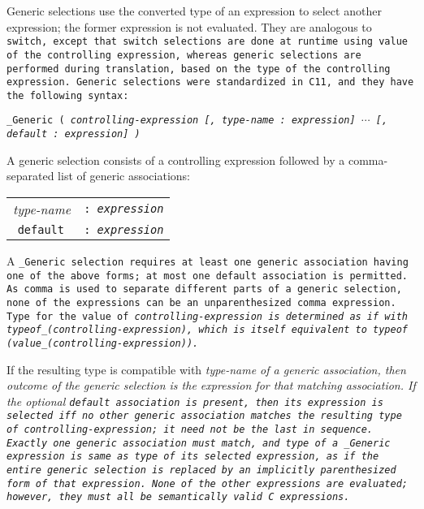 \def\Subsection#1{\subsection{#1}}

Generic selections use the converted type of an expression to
select another expression; the former expression is not evaluated.
They are analogous to \tt{switch}, except that \tt{switch} selections are done at
runtime using value of the controlling expression, whereas generic selections are
performed during translation, based on the type of the controlling expression.
Generic selections were standardized in C11, and they have the following syntax:

\tt{_Generic (} \it{controlling-expression}
[\tt{,} \it{type-name} \tt{:} \it{expression}] $\cdots$
[\tt{, default :} \it{expression}]
\tt{)}

A generic selection consists of a controlling expression
followed by a comma-separated list of generic associations:

\begin{tabular}{r@{\hskip 0pt}l}

\it{type-name} & \s\tt{:} \it{expression}\\

\tt{default} & \s\tt{:} \it{expression}\\

\end{tabular}

A \tt{_Generic} selection requires at least one generic association having
one of the above forms; at most one \tt{default} association is permitted.
As comma is used to separate different parts of a generic selection,
none of the expressions can be an unparenthesized comma expression.
Type for the value of \it{controlling-expression} is determined as if with
\tt{typeof_(}\it{controlling-expression}\tt{)}, which is itself equivalent to
\tt{typeof (value_(}\it{controlling-expression}\tt{))}.

If the resulting type is compatible with \it{type-name} of a generic association,
then outcome of the generic selection is the
\it{expression} for that matching association.
If the optional \tt{default} association is present, then its \it{expression}
is selected iff no other generic association matches the resulting type
of \it{controlling-expression}; it need not be the last in sequence.
Exactly one generic association must match, and type of a \tt{_Generic}
expression is same as type of its selected expression, as if the entire generic
selection is replaced by an implicitly parenthesized form of that expression.
None of the other expressions are evaluated;
however, they must all be semantically valid C expressions.

